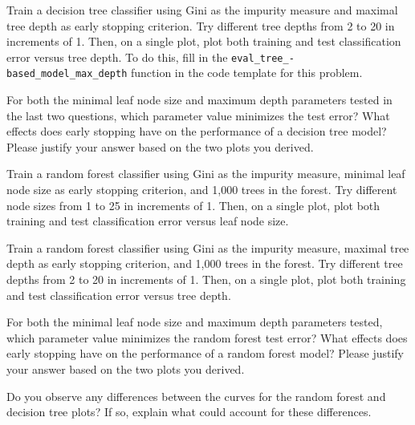 \problem[7] Train a decision tree classifier using Gini as the impurity measure and maximal tree
depth as early stopping criterion. Try different tree depths from 2 to 20 in increments of 1. Then, on a single plot, plot both training and test classification error versus tree depth. To do this, fill in the \texttt{eval_tree_-based_model_max_depth} function in the code template for this problem.
\begin{solution}
\end{solution}
\newpage


\problem[4] For both the minimal leaf node size and maximum depth parameters tested in
the last two questions, which parameter value minimizes the test error? What effects does early stopping have on the performance of a decision tree model? Please justify your answer based on the two plots you derived.
\begin{solution}
\end{solution}
\newpage


\indent\problem[2] %
Train a random forest classifier using Gini as the impurity measure, minimal leaf node size as early stopping criterion, and 1,000 trees in the forest. Try different node sizes from 1 to 25 in increments of 1. Then, on a single plot, plot both training and test classification error versus leaf node size.
\begin{solution}
\end{solution}
\newpage


\problem[2] Train a random forest classifier using Gini as the impurity measure, maximal tree
depth as early stopping criterion, and 1,000 trees in the forest. Try different tree depths from 2 to 20 in increments of 1. Then, on a single plot, plot both training and test classification error versus tree depth.
\begin{solution}
\end{solution}
\newpage


\problem[4] For both the minimal leaf node size and maximum depth parameters tested, which
parameter value minimizes the random forest test error? What effects does early stopping have on the performance of a random forest model? Please justify your answer based on the two plots you derived.
\begin{solution}
\end{solution}
\newpage


\problem[4] Do you observe any differences between the curves for the random forest and
decision tree plots? If so, explain what could account for these differences.
\begin{solution}
\end{solution}
\newpage





